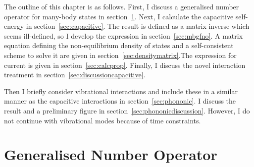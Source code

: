 The outline of this chapter is as follows. First, I discuss a generalised number operator for many-body states in section~\ref{sec:gno}. Next, I calculate the capacitive self-energy in section~\ref{sec:capacitive}. The result is defined as a matrix-inverse which seems ill-defined, so I develop the expression in section~\ref{sec:mbgfno}. A matrix equation defining the non-equilibrium density of states and a self-consistent scheme to solve it are given in section~\ref{sec:densitymatrix}.The expression for current is given in section~\ref{sec:calcprop}. Finally, I discuss the novel interaction treatment in section~\ref{sec:discussioncapacitive}.

Then I briefly consider vibrational interactions and include these in a similar manner as the capacitive interactions in section~\ref{sec:phononic}. I discuss the result and a preliminary figure in section~\ref{sec:phononicdiscussion}. However, I do not continue with vibrational modes because of time constraints.
\section{Generalised Number Operator}
\label{sec:gno}


